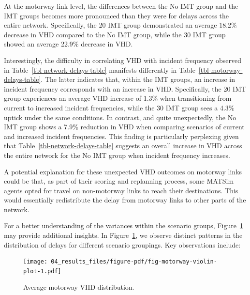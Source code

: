 \documentclass[fancy, oneside, mastersfancy, ms]{byuthesis}
\begin{document}
At the motorway link level, the differences between the No IMT group and
the IMT groups becomes more pronounced than they were for delays across
the entire network. Specifically, the 20 IMT group demonstrated an
average 18.2\% decrease in VHD compared to the No IMT group, while the
30 IMT group showed an average 22.9\% decrease in VHD.

Interestingly, the difficulty in correlating VHD with incident frequency
observed in Table~\ref{tbl-network-delays-table} manifests differently
in Table~\ref{tbl-motorway-delays-table}. The latter indicates that,
within the IMT groups, an increase in incident frequency corresponds
with an increase in VHD. Specifically, the 20 IMT group experiences an
average VHD increase of 1.3\% when transitioning from current to
increased incident frequencies, while the 30 IMT group sees a 4.3\%
uptick under the same conditions. In contrast, and quite unexpectedly,
the No IMT group shows a 7.9\% reduction in VHD when comparing scenarios
of current and increased incident frequencies. This finding is
particularly perplexing given that Table~\ref{tbl-network-delays-table}
suggests an overall increase in VHD across the entire network for the No
IMT group when incident frequency increases.

A potential explanation for these unexpected VHD outcomes on motorway
links could be that, as part of their scoring and replanning process,
some MATSim agents opted for travel on non-motorway links to reach their
destinations. This would essentially redistribute the delay from
motorway links to other parts of the network.

For a better understanding of the variances within the scenario groups,
Figure~\ref{fig-motorway-violin-plot} may provide additional insights.
In Figure~\ref{fig-motorway-violin-plot}, we observe distinct patterns
in the distribution of delays for different scenario groupings. Key
observations include:

\begin{figure}

{\centering \texttt{[image: 04\_results\_files/figure-pdf/fig-motorway-violin-plot-1.pdf]}

}

\caption{\label{fig-motorway-violin-plot}Average motorway VHD
distribution.}

\end{figure}
\end{document}
